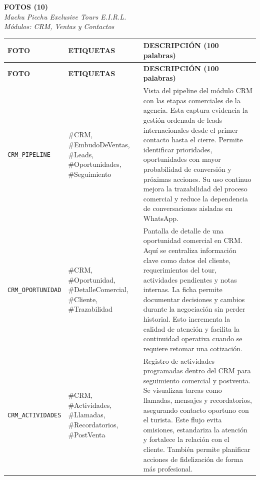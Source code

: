 \documentclass[11pt,a4paper]{article}
\begin{document}
\begin{center}
{\Large\textbf{FOTOS (10)}}\\[2mm]
\textit{Machu Picchu Exclusive Tours E.I.R.L.}\\
\textit{Módulos: CRM, Ventas y Contactos}
\end{center}

\vspace{3mm}

\begin{longtable}{|>{\centering\arraybackslash}m{}|>{\RaggedRight\arraybackslash}m{}|>{\RaggedRight\arraybackslash}m{}|}
\hline
\rowcolor{gray!20}
\textbf{FOTO} & \textbf{ETIQUETAS} & \textbf{DESCRIPCIÓN (100 palabras)}\\
\hline
\endfirsthead
\hline
\rowcolor{gray!20}
\textbf{FOTO} & \textbf{ETIQUETAS} & \textbf{DESCRIPCIÓN (100 palabras)}\\
\hline
\endhead

\texttt{CRM\_PIPELINE}
&
\#CRM, \#EmbudoDeVentas, \#Leads, \#Oportunidades, \#Seguimiento
&
Vista del pipeline del módulo CRM con las etapas comerciales de la agencia. Esta captura evidencia la gestión ordenada de leads internacionales desde el primer contacto hasta el cierre. Permite identificar prioridades, oportunidades con mayor probabilidad de conversión y próximas acciones. Su uso continuo mejora la trazabilidad del proceso comercial y reduce la dependencia de conversaciones aisladas en WhatsApp.
\\ \hline

\texttt{CRM\_OPORTUNIDAD}
&
\#CRM, \#Oportunidad, \#DetalleComercial, \#Cliente, \#Trazabilidad
&
Pantalla de detalle de una oportunidad comercial en CRM. Aquí se centraliza información clave como datos del cliente, requerimientos del tour, actividades pendientes y notas internas. La ficha permite documentar decisiones y cambios durante la negociación sin perder historial. Esto incrementa la calidad de atención y facilita la continuidad operativa cuando se requiere retomar una cotización.
\\ \hline

\texttt{CRM\_ACTIVIDADES}
&
\#CRM, \#Actividades, \#Llamadas, \#Recordatorios, \#PostVenta
&
Registro de actividades programadas dentro del CRM para seguimiento comercial y postventa. Se visualizan tareas como llamadas, mensajes y recordatorios, asegurando contacto oportuno con el turista. Este flujo evita omisiones, estandariza la atención y fortalece la relación con el cliente. También permite planificar acciones de fidelización de forma más profesional.
\\ \hline


\end{longtable}
\end{document}
